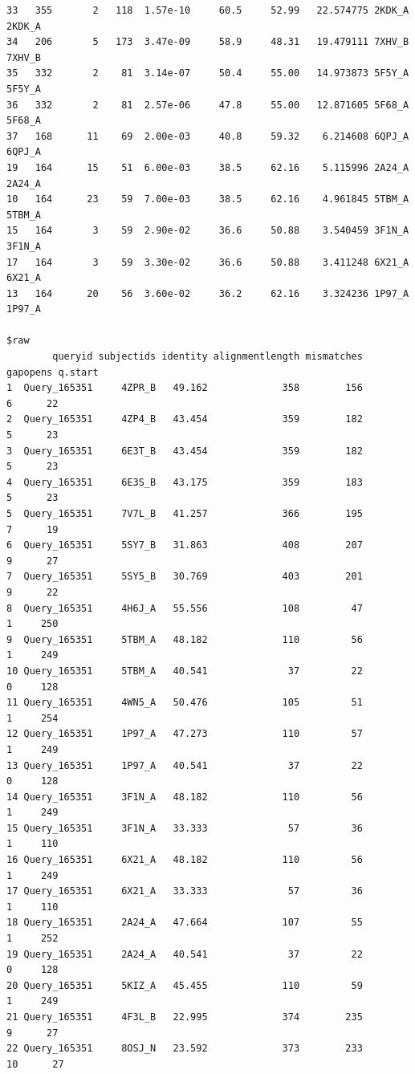 \documentclass[
  letterpaper,
  DIV=11,
  numbers=noendperiod]{scrartcl}
\begin{document}
\begin{verbatim}
33   355       2   118  1.57e-10     60.5     52.99   22.574775 2KDK_A 2KDK_A
34   206       5   173  3.47e-09     58.9     48.31   19.479111 7XHV_B 7XHV_B
35   332       2    81  3.14e-07     50.4     55.00   14.973873 5F5Y_A 5F5Y_A
36   332       2    81  2.57e-06     47.8     55.00   12.871605 5F68_A 5F68_A
37   168      11    69  2.00e-03     40.8     59.32    6.214608 6QPJ_A 6QPJ_A
19   164      15    51  6.00e-03     38.5     62.16    5.115996 2A24_A 2A24_A
10   164      23    59  7.00e-03     38.5     62.16    4.961845 5TBM_A 5TBM_A
15   164       3    59  2.90e-02     36.6     50.88    3.540459 3F1N_A 3F1N_A
17   164       3    59  3.30e-02     36.6     50.88    3.411248 6X21_A 6X21_A
13   164      20    56  3.60e-02     36.2     62.16    3.324236 1P97_A 1P97_A

$raw
        queryid subjectids identity alignmentlength mismatches gapopens q.start
1  Query_165351     4ZPR_B   49.162             358        156        6      22
2  Query_165351     4ZP4_B   43.454             359        182        5      23
3  Query_165351     6E3T_B   43.454             359        182        5      23
4  Query_165351     6E3S_B   43.175             359        183        5      23
5  Query_165351     7V7L_B   41.257             366        195        7      19
6  Query_165351     5SY7_B   31.863             408        207        9      27
7  Query_165351     5SY5_B   30.769             403        201        9      22
8  Query_165351     4H6J_A   55.556             108         47        1     250
9  Query_165351     5TBM_A   48.182             110         56        1     249
10 Query_165351     5TBM_A   40.541              37         22        0     128
11 Query_165351     4WN5_A   50.476             105         51        1     254
12 Query_165351     1P97_A   47.273             110         57        1     249
13 Query_165351     1P97_A   40.541              37         22        0     128
14 Query_165351     3F1N_A   48.182             110         56        1     249
15 Query_165351     3F1N_A   33.333              57         36        1     110
16 Query_165351     6X21_A   48.182             110         56        1     249
17 Query_165351     6X21_A   33.333              57         36        1     110
18 Query_165351     2A24_A   47.664             107         55        1     252
19 Query_165351     2A24_A   40.541              37         22        0     128
20 Query_165351     5KIZ_A   45.455             110         59        1     249
21 Query_165351     4F3L_B   22.995             374        235        9      27
22 Query_165351     8OSJ_N   23.592             373        233       10      27

\end{verbatim}
\end{document}
